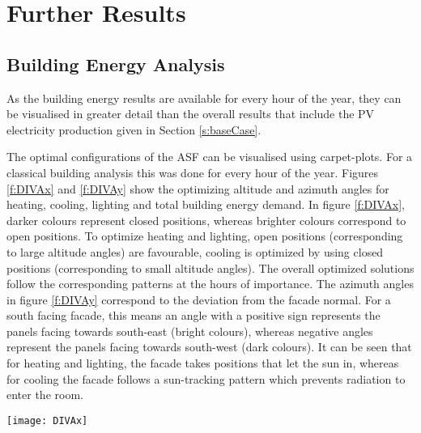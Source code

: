 
\chapter{Further Results}\label{furtherResults}

\section{Building Energy Analysis}
\label{s:buildingResults}
	
	As the building energy results are available for every hour of the year, they can be visualised in greater detail than the overall results that include the PV electricity production given in Section \ref{s:baseCase}. 

	The optimal configurations of the ASF can be visualised using carpet-plots. For a classical building analysis this was done for every hour of the year. Figures \ref{f:DIVAx} and \ref{f:DIVAy} show the optimizing altitude and azimuth angles for heating, cooling, lighting and total building energy demand. In figure \ref{f:DIVAx}, darker colours represent closed positions, whereas brighter colours correspond to open positions. To optimize heating and lighting, open positions (corresponding to large altitude angles) are favourable, cooling is optimized by using closed positions (corresponding to small altitude angles). The overall optimized solutions follow the corresponding patterns at the hours of importance. The azimuth angles in figure \ref{f:DIVAy} correspond to the deviation from the facade normal. For a south facing facade, this means an angle with a positive sign represents the panels facing towards south-east (bright colours), whereas negative angles represent the panels facing towards south-west (dark colours). It can be seen that for heating and lighting, the facade takes positions that let the sun in, whereas for cooling the facade follows a sun-tracking pattern which prevents radiation to enter the room. 

	\begin{figure*}
		\begin{center}
		\texttt{[image: DIVAx]}
		\caption{Carpet plots detailing the optimal altitude angles to minimise the (a) heating demand, (b) cooling demand, (c) lighting demand, and (d) total building energy demand. Darker colours represent closed positions, whereas brighter colors correspond to open positions. To optimize heating and lighting, open positions are favorable, cooling is optimized by using closed positions.}
		\label{f:DIVAx}
		\end{center}
	\end{figure*}


